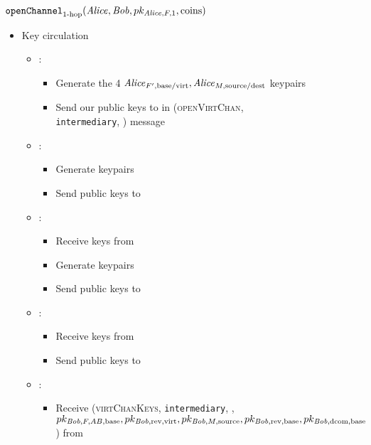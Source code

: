 \begin{figure}[H]
  \begin{protocolbox}{$\mathtt{openChannel}_{\text{1-hop}}(\mathit{Alice}, \mathit{Bob},
  pk_{\mathit{Alice}, F, 1}, \mathrm{coins})$}
    \begin{algorithmic}[1]
    \begin{itemize}
      \item Key circulation
      \begin{itemize}
        \item \alice:
        \begin{itemize}
          \item Generate the 4 $\mathit{Alice}_{F', \mathrm{base}/\mathrm{virt}}, \mathit{Alice}_{M,
          \mathrm{source}/\mathrm{dest}}$ keypairs
          \item Send our public keys to \bob{} in (\textsc{openVirtChan},
          \texttt{intermediary}, \charlie) message
        \end{itemize}
        \item \bob:
        \begin{itemize}
          \item Generate \TODO{} keypairs
          \item Send \TODO{} public keys to \charlie
        \end{itemize}
        \item \charlie:
        \begin{itemize}
          \item Receive \TODO{} keys from \bob
          \item Generate \TODO{} keypairs
          \item Send \TODO{} public keys to \bob
        \end{itemize}
        \item \bob:
        \begin{itemize}
          \item Receive \TODO{} keys from \charlie
          \item Send \TODO{} public keys to \alice
        \end{itemize}
        \item \alice:
        \begin{itemize}
          \item Receive (\textsc{virtChanKeys}, \texttt{intermediary}, \charlie,
          $pk_{\mathit{Bob}, F, AB, \mathrm{base}}, pk_{\mathit{Bob}, \mathrm{rev}, \mathrm{virt}},
          pk_{\mathit{Bob}, M, \mathrm{source}}, pk_{\mathit{Bob}, \mathrm{rev}, \mathrm{base}},
          pk_{\mathit{Bob}, \mathrm{dcom}, \mathrm{base}}$) from \bob

\end{itemize}
\end{itemize}
\end{itemize}
\end{algorithmic}
\end{protocolbox}
\end{figure}
